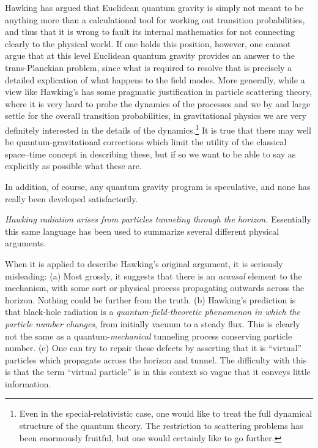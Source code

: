 \documentclass[
%
draft    %
,numberedheadings 
,bibliocites
  ]
  {aipproc}
\begin{document}
Hawking \citep{Hawking:1996jh} has argued that Euclidean quantum gravity is simply not meant to be anything more than a calculational tool for working out transition probabilities, and thus that it is wrong to fault its internal mathematics for not connecting clearly to the physical world.  If one holds this position, however, one cannot argue that at this level Euclidean quantum gravity provides an answer to the trans-Planckian problem, since what is required to resolve that is precisely a detailed explication of what happens to the field modes. 
More generally, while a view like Hawking's has some pragmatic justification
in particle scattering theory, where it is very hard to probe the dynamics of the processes and we by and large settle for the overall transition probabilities, in gravitational physics we are very definitely interested in the details of the dynamics.\footnote{Even in the special-relativistic case, one would like to treat the full dynamical structure of the quantum theory.  The restriction to scattering problems has been enormously fruitful, but one would certainly like to go further.}  It is true that there may well be quantum-gravitational corrections which limit the utility of the classical space--time concept in describing these, but if so we want to be able to say as explicitly as possible what these are.  

In addition, of course, any quantum gravity program is speculative, and none has really been developed satisfactorily.



{\em Hawking radiation arises from particles tunneling through the horizon.}
Essentially this same language has been used to summarize several different physical arguments.

When it is applied to describe Hawking's original argument, it is seriously misleading:
(a) Most grossly, it suggests that there is an {\em acausal} element to the mechanism, with some sort or physical process
propagating outwards across the horizon.  Nothing could be
further from the truth.
(b) Hawking's prediction is that black-hole radiation is a {\em quantum-field-theoretic phenomenon in which the particle number changes}, from initially vacuum to a steady flux.  This is clearly not the same as a quantum-{\em mechanical} tunneling process conserving particle number.
(c) One can try to repair these defects by asserting that it is ``virtual'' particles which propagate across the horizon and tunnel.  The difficulty with this is that the term ``virtual particle'' is in this context so vague that it conveys little information.
\end{document}
